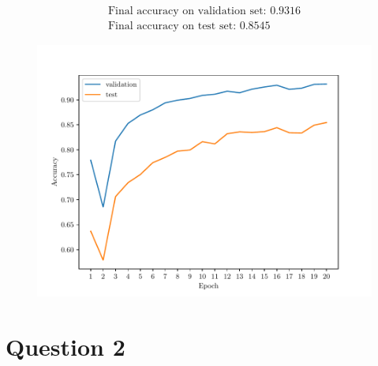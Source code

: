 \documentclass{exam}
\begin{document}
\begin{questions}
\begin{parts}
            \begin{align*}
                \text{Final accuracy on validation set: } 0.9316 \\
                \text{Final accuracy on test set: } 0.8545
            \end{align*}

            \vspace{-2.5em}
            \begin{figure}[H]
                \centering
                \includegraphics[scale = 0.75]{mlp.pdf}
            \end{figure}

        \end{parts}


    \end{questions}

    \section*{Question 2}
\end{document}
